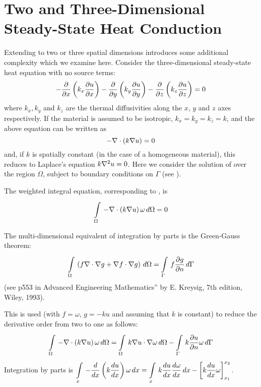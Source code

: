 \section{Two and Three-Dimensional Steady-State Heat Conduction}
\label{sec:2and3-DSSHC}
Extending  to two or three spatial dimensions 
introduces some additional complexity which we examine here. Consider the
three-dimensional steady-state heat equation with no source terms:
\begin{equation*}
  - \dfrac{\partial  }{\partial x} \left( k_{x} \dfrac{\partial u}{\partial x}  \right) - \dfrac{\partial  }{\partial y} \left( k_{y} \dfrac{\partial u}{\partial y}  \right)
  - \dfrac{\partial  }{\partial z} \left( k_{z} \dfrac{\partial u}{\partial z}  \right)=0
\end{equation*}       
where $k_{x},k_{y}$ and $k_{z}$ are the thermal diffusivities along the $x$, $y$
and $z$ axes respectively. If the material is assumed to be isotropic, $k_{x}
= k_{y} = k_{z} = k$, and the above equation can be written
as
\begin{equation}
  - \nabla\cdot\left( k \nabla u \right)  = 0
  \label{eqn:S-SH}
\end{equation}
and, if $k$ is spatially constant (in the case of a homogeneous material), this reduces to Laplace's equation 
$k\nabla^{2} {u}=0$. Here we consider the solution of  over the 
region $\Omega$, subject to boundary conditions on $\Gamma$ (see ).

The weighted integral equation, corresponding to , is
\begin{equation}
     \displaystyle\int\limits_{\Omega}^{} \,- \nabla\cdot\left( k\nabla u \right) \omega\,d\Omega   = 0
  \label{eqn:weighted_integral}
\end{equation}

The multi-dimensional equivalent of integration by parts is the Green-Gauss
theorem:
\begin{equation}
     \displaystyle\int\limits_{\Omega}^{} \,\left( f \nabla\cdot\nabla g +\nabla f\cdot\nabla g \right)\,d\Omega   =
     \displaystyle\int\limits_{\Gamma}^{} \,f  \dfrac{\partial g}{\partial n} \,d\Gamma  
  \label{eqn:nabla_eq}
\end{equation}
(see p553 in Advanced Engineering Mathematics'' by E. Kreysig, 7th edition,
Wiley, 1993).

This is used (with $f=\omega$, $g=-ku$ and assuming that $k$ is constant) 
to reduce the derivative order from two to one as follows:
\begin{equation}
     \displaystyle\int\limits_{\Omega}^{} \,- \nabla\cdot\left( k\nabla u \right) \omega\,d\Omega   
  =    \displaystyle\int\limits_{\Omega}^{} \,k \nabla u\cdot\nabla  \omega\,d\Omega   
  -    \displaystyle\int\limits_{\Gamma}^{} \,k \dfrac{\partial u}{\partial n}  \omega\,d\Gamma        
  \label{eqn:Green-Gauss}
\end{equation}
\cf Integration by parts is $   \displaystyle\int\limits_{x}^{} \,- \dfrac{ d  }{d x} \left( k \dfrac{ d u}{d x}  \right)\omega\,dx   =
   \displaystyle\int\limits_{x}^{} \,k  \dfrac{ d u}{d x}   \dfrac{ d \omega}{d x} \,dx   -  \displaystyle\left[ k \dfrac{ d u}{d x} \omega \right]_{x_{1}}^{x_{2}} $.

